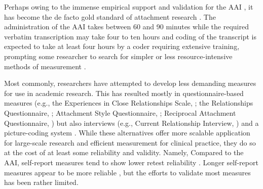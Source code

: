 \documentclass[12pt]{report}
\begin{document}
Perhaps owing to the immense empirical support and validation for the AAI \cite{BakermansKranenburg1993, IJzendoorn1995, Crowell1996Discriminant, Sagi1994}, it has become the de facto gold standard of attachment research \cite{AAITest, Talia2019, haltigan2014adult}.
The administration of the AAI takes between 60 and 90 minutes while the required verbatim transcription may take four to ten hours and coding of the transcript is expected to take at least four hours by a coder requiring extensive training, prompting some researcher to search for simpler or less resource-intensive methods of measurement \cite{Haas1994}.

Most commonly, researchers have attempted to develop less demanding measures for use in academic research.
This has resulted mostly in questionnaire-based measures (e.g., the Experiences in Close Relationships Scale, \cite{Brennan1998}; the Relationships Questionnaire, \cite{Bartholomew1991}; Attachment Style Questionnaire, \cite{Feeney1994ASQ}; Reciprocal Attachment Questionnaire, \cite{West1992}) but also interviews (e.g., Current Relationship Interview, \cite{Crowell1996}) and a picture-coding system \cite{George2012}.
While these alternatives offer more scalable application for large-scale research and efficient measurement for clinical practice, they do so at the cost of at least some reliability and validity. Namely, Compared to the AAI, self-report measures tend to show lower retest reliability \cite{Scharfe1994}.
Longer self-report measures appear to be more reliable \cite{Sibley2005,Wongpakaran2021}, but the efforts to validate most measures has been rather limited.
\end{document}

